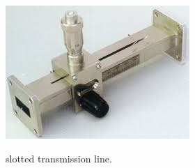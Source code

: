 \begin{example}
\begin{figure}[h]
\centering
\includegraphics[width=1\linewidth]{./graphics/fig3}
\label{fig:fig3}
\caption{slotted transmission line.}
\end{figure}


\end{example}
